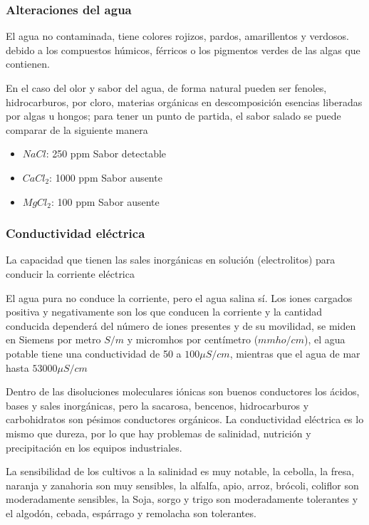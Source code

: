 \subsubsection{Alteraciones del agua}

El agua no contaminada, tiene colores rojizos, pardos, amarillentos y verdosos.
debido a los compuestos húmicos, férricos o los pigmentos verdes de las algas que contienen.

En el caso del olor y sabor del agua, de forma natural pueden ser fenoles, hidrocarburos, por cloro, materias orgánicas en descomposición esencias liberadas por algas u hongos;
para tener un punto de partida, el sabor salado se puede comparar de la siguiente manera

\begin{itemize}
    \item $NaCl$: 250 ppm Sabor detectable 
    \item $CaCl_2$: 1000 ppm Sabor ausente
    \item $MgCl_2$: 100 ppm Sabor ausente
\end{itemize}
\subsubsection{Conductividad eléctrica}
La capacidad que tienen las sales inorgánicas en solución (electrolitos) para conducir la corriente eléctrica

El agua pura no conduce la corriente, pero el agua salina sí. Los iones cargados positiva y negativamente son los que conducen la corriente y la cantidad conducida dependerá del número de iones presentes y de su movilidad, se miden en Siemens por metro $S/m$
y micromhos por centímetro ($mmho/cm$), el agua potable tiene una conductividad de 50 a $100\mu S/cm$, mientras que el agua de mar hasta $53000\mu S/cm$

Dentro de las disoluciones moleculares iónicas son buenos conductores los ácidos, bases y sales inorgánicas, pero la sacarosa, bencenos, hidrocarburos y carbohidratos son pésimos conductores orgánicos. La conductividad eléctrica es lo mismo que dureza, por lo que hay problemas de salinidad, nutrición y precipitación en los equipos industriales.

La sensibilidad de los cultivos a la salinidad es muy notable, la cebolla, la fresa, naranja y zanahoria son muy sensibles, la alfalfa, apio, arroz, brócoli, coliflor son moderadamente sensibles, la Soja, sorgo y trigo son moderadamente tolerantes y el algodón, cebada, espárrago y remolacha son tolerantes.

